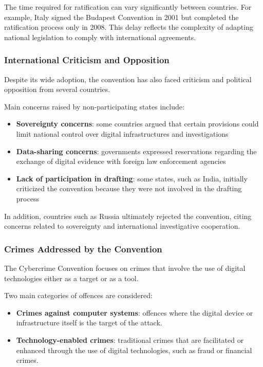\noindent
The time required for ratification can vary significantly between countries. For example, Italy signed the Budapest Convention in 2001 but completed the ratification process only in 2008. This delay reflects the complexity of adapting national legislation to comply with international agreements.



\subsubsection{International Criticism and Opposition}

Despite its wide adoption, the convention has also faced criticism and political opposition from several countries.

\medskip
\noindent
Main concerns raised by non-participating states include:

\begin{itemize}
    \item \textbf{Sovereignty concerns}: some countries argued that certain provisions could limit national control over digital infrastructures and investigations

    \item \textbf{Data-sharing concerns}: governments expressed reservations regarding the exchange of digital evidence with foreign law enforcement agencies

    \item \textbf{Lack of participation in drafting}: some states, such as India, initially criticized the convention because they were not involved in the drafting process
\end{itemize}

\noindent
In addition, countries such as Russia ultimately rejected the convention, citing concerns related to sovereignty and international investigative cooperation.



\subsubsection{Crimes Addressed by the Convention}

The Cybercrime Convention focuses on crimes that involve the use of digital technologies either as a target or as a tool.
\medskip

\noindent
Two main categories of offences are considered:

\begin{itemize}
    \item \textbf{Crimes against computer systems}: offences where the digital device or infrastructure itself is the target of the attack.

    \item \textbf{Technology-enabled crimes}: traditional crimes that are facilitated or enhanced through the use of digital technologies, such as fraud or financial crimes.
\end{itemize}

